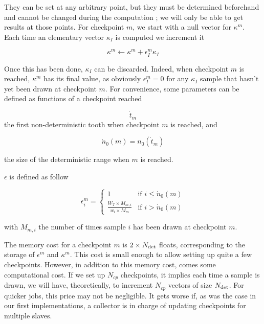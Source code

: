 \documentclass[./thesis.tex]{subfiles}
\begin{document}
They can be set at any arbitrary point, but they must be determined beforehand and cannot be changed during the computation ; we will only be able to get results at those points.
For checkpoint $m$, we start with a null vector for $\kappa^m$. Each time an elementary vector $\kappa_I$ is computed
we increment it 



\begin{equation}
\kappa^m \gets \kappa^m + \epsilon_I^{m} \kappa_I
\end{equation}


Once this has been done, $\kappa_I$ can be discarded. Indeed, when checkpoint $m$ is reached, $\kappa^{m}$ has its final value, as obviously $\epsilon_I^{m} = 0$ for any $\kappa_I$ sample that hasn't yet been drawn at checkpoint ${m}$.
For convenience, some parameters can be defined as functions of a checkpoint reached

\begin{equation}
\dot t_m
\end{equation}
the first non-deterministic tooth when checkpoint $m$ is reached, and

\begin{equation}
\dot n_0(m) = n_0(\dot t_m)
\end{equation}

the size of the deterministic range when $m$ is reached.


$\epsilon$ is defined as follow

\begin{equation}
\epsilon^m_i = 
\begin{cases}
1 & \text{if } i \leq \dot n_0(m) \\
\frac{W_T \times M_{m,i}}{w_i \times M_m} & \text{if } i > \dot n_0(m)
\end{cases}
\end{equation}


with $M_{m,i}$ the number of times sample $i$ has been drawn at checkpoint $m$.


The memory cost for a checkpoint $m$ is $2 \times {N_\text{det}}$ floats, corresponding to the storage of $\epsilon^m$ and $\kappa^m$. This cost is small enough to allow setting up quite a few checkpoints. However, in addition to this memory cost, comes some computational cost. If we set up $N_{cp}$ checkpoints, it implies each time a sample is drawn, we will have, theoretically, to increment $N_{cp}$ vectors of size ${N_\text{det}}$. For quicker jobs, this price may not be negligible. It gets worse if, as was the case in our first implementations, a collector is in charge of updating checkpoints for multiple slaves. 
\end{document}
